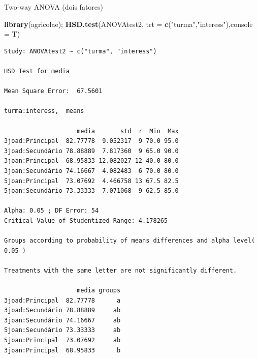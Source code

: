 \documentclass[
  9pt,
  ignorenonframetext,
  aspectratio=169]{beamer}
\newenvironment{Shaded}{\begin{snugshade}}{\end{snugshade}}
\newcommand{\DataTypeTok}[1]{\textcolor[rgb]{0.13,0.29,0.53}{#1}}
\newcommand{\KeywordTok}[1]{\textcolor[rgb]{0.13,0.29,0.53}{\textbf{#1}}}
\newcommand{\NormalTok}[1]{#1}
\newcommand{\StringTok}[1]{\textcolor[rgb]{0.31,0.60,0.02}{#1}}
\begin{document}
\begin{frame}[fragile]{Two-way ANOVA (dois fatores)}
\protect\hypertarget{two-way-anova-dois-fatores-1}{}
\begin{Shaded}
\begin{Highlighting}[]
\KeywordTok{library}\NormalTok{(agricolae); }\KeywordTok{HSD.test}\NormalTok{(ANOVAtest2, }\DataTypeTok{trt =} \KeywordTok{c}\NormalTok{(}\StringTok{"turma"}\NormalTok{,}\StringTok{"interess"}\NormalTok{),}\DataTypeTok{console =}\NormalTok{ T)}
\end{Highlighting}
\end{Shaded}

\begin{verbatim}
Study: ANOVAtest2 ~ c("turma", "interess")

HSD Test for media 

Mean Square Error:  67.5601 

turma:interess,  means

                    media       std  r  Min  Max
3joad:Principal  82.77778  9.052317  9 70.0 95.0
3joad:Secundário 78.88889  7.817360  9 65.0 90.0
3joan:Principal  68.95833 12.082027 12 40.0 80.0
3joan:Secundário 74.16667  4.082483  6 70.0 80.0
5joan:Principal  73.07692  4.466758 13 67.5 82.5
5joan:Secundário 73.33333  7.071068  9 62.5 85.0

Alpha: 0.05 ; DF Error: 54 
Critical Value of Studentized Range: 4.178265 

Groups according to probability of means differences and alpha level( 0.05 )

Treatments with the same letter are not significantly different.

                    media groups
3joad:Principal  82.77778      a
3joad:Secundário 78.88889     ab
3joan:Secundário 74.16667     ab
5joan:Secundário 73.33333     ab
5joan:Principal  73.07692     ab
3joan:Principal  68.95833      b
\end{verbatim}
\end{frame}
\end{document}
